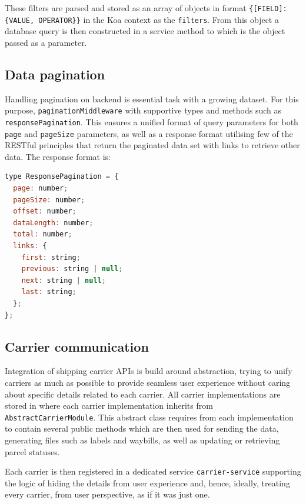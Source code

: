 These filters are parsed and stored as an array of objects in format \texttt{\{[FIELD]: \{VALUE, OPERATOR\}\}} in the Koa context as the \texttt{filters}.
From this object a database query is then constructed in a service method to which is the object passed as a parameter.

\subsection{Data pagination}
Handling pagination on backend is essential task with a growing dataset.
For this purpose, \texttt{paginationMiddleware} with supportive types and methods such as \texttt{responsePagination}.
This ensures a unified format of query parameters for both \texttt{page} and \texttt{pageSize} parameters, as well as a response format utilising few of the RESTful principles that return the paginated data set with links to retrieve other data.
The response format is:
\begin{lstlisting}[language=JavaScript,caption={Response pagination type}]
type ResponsePagination = {
  page: number;
  pageSize: number;
  offset: number;
  dataLength: number;
  total: number;
  links: {
    first: string;
    previous: string | null;
    next: string | null;
    last: string;
  };
};
\end{lstlisting}

\subsection{Carrier communication}
Integration of shipping carrier APIs is build around abstraction, trying to unify carriers as much as possible to provide seamless user experience without caring about specific details related to each carrier.
All carrier implementations are stored in  where each carrier implementation inherits from \texttt{AbstractCarrierModule}.
This abstract class requires from each implementation to contain several public methods which are then used for sending the data, generating files such as labels and waybills, as well as updating or retrieving parcel statuses.

Each carrier is then registered in a dedicated service \texttt{carrier-service} supporting the logic of hiding the details from user experience and, hence, ideally, treating every carrier, from user perspective, as if it was just one.

